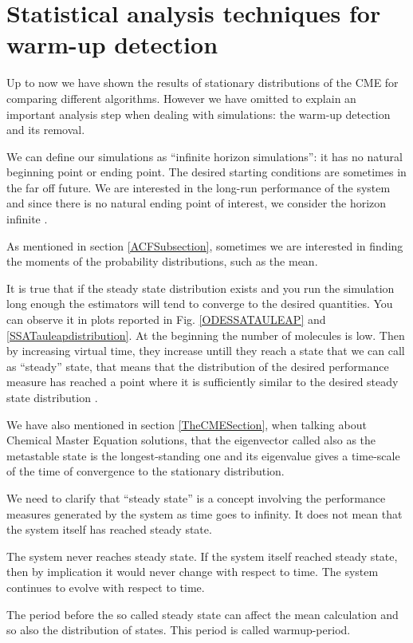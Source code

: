 \documentclass[12pt,a4paper]{report}
\begin{document}
\section{Statistical analysis techniques for warm-up detection}\label{warmupsection}
Up to now we have shown the results of stationary distributions of the CME for comparing different algorithms. However we have omitted to explain an important analysis step when dealing with simulations: the warm-up detection and its removal. 

We can define our simulations as  ``infinite horizon simulations'': it has no natural beginning point or ending point. The desired starting conditions are sometimes in the far off future. We are interested in the long-run performance of the system and since there is no natural ending point of interest, we consider the horizon infinite \cite{Manuel}.  

As mentioned in section \ref{ACFSubsection}, sometimes we are interested in finding the moments of the probability distributions, such as the mean.

It is true that if the steady state distribution exists and you run the simulation long enough the estimators will tend to converge to the desired quantities. You can observe it in plots reported in Fig. \ref{ODESSATAULEAP} and \ref{SSATauleapdistribution}. At the beginning the number of molecules is low. Then by increasing virtual time, they increase untill they reach a state that we can call as ``steady'' state, that means that the distribution of the desired performance measure has reached a point where it is sufficiently similar to the desired steady state distribution \cite{Manuel}. 

We have also mentioned in section \ref{TheCMESection}, when talking about Chemical Master Equation solutions, that the eigenvector called also as the metastable state is the longest-standing one and its eigenvalue gives a time-scale of the time of convergence to the stationary distribution.

We need to clarify that ``steady state'' is a concept involving the performance measures generated by the system as time goes to infinity. It does not mean that the system itself has reached steady state.

The system never reaches steady state. If the system itself reached steady state, then by implication it would never change with respect to time. The system continues to evolve with respect to time.

The period before the so called steady state can affect the mean calculation and so also the distribution of states. This period is called warmup-period.
\end{document}
